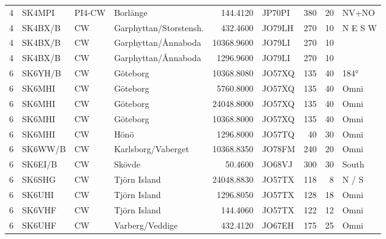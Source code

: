 {\begin{landscape}
\begin{longtable}{rlllrlrrl}
	                 4 & SK4MPI     & PI4-CW  & Borlänge               &     144.4120 & JP70PI      &      380 &       20 & NV+NO        \\
	                 4 & SK4BX/B    & CW      & Garphyttan/Storstensh. &     432.4600 & JO79LH      &      270 &       10 & N E S W      \\
	                 4 & SK4BX/B    & CW      & Garphyttan/Ånnaboda    &   10368.9600 & JO79LI      &      270 &       10 &              \\
	                 4 & SK4BX/B    & CW      & Garphyttan/Ånnaboda    &    1296.9600 & JO79LI      &      270 &       10 &              \\
	                 6 & SK6YH/B    & CW      & Göteborg               &   10368.8080 & JO57XQ      &      135 &       40 & 184°         \\
	                 6 & SK6MHI     & CW      & Göteborg               &    5760.8000 & JO57XQ      &      135 &       40 & Omni         \\
	                 6 & SK6MHI     & CW      & Göteborg               &   24048.8000 & JO57XQ      &      135 &       40 & Omni         \\
	                 6 & SK6MHI     & CW      & Göteborg               &   10368.8000 & JO57XQ      &      135 &       40 & Omni         \\
	                 6 & SK6MHI     & CW      & Hönö                   &    1296.8000 & JO57TQ      &       40 &       30 & Omni         \\
	                 6 & SK6WW/B    & CW      & Karlsborg/Vaberget     &   10368.8350 & JO78FM      &      240 &       20 & Omni         \\
	                 6 & SK6EI/B    & CW      & Skövde                 &      50.4600 & JO68VJ      &      300 &       30 & South        \\
	                 6 & SK6SHG     & CW      & Tjörn Island           &   24048.8830 & JO57TX      &      118 &        8 & N / S        \\
	                 6 & SK6UHI     & CW      & Tjörn Island           &    1296.8050 & JO57TX      &      128 &       18 & Omni         \\
	                 6 & SK6VHF     & CW      & Tjörn Island           &     144.4060 & JO57TX      &      122 &       12 & Omni         \\
	                 6 & SK6UHF     & CW      & Varberg/Veddige        &     432.4120 & JO67EH      &      175 &       25 & Omni         \\

\end{longtable}
\end{landscape}}
